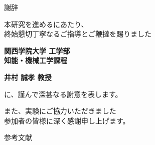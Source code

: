 \documentclass[aspectratio=169,10pt]{beamer}
\begin{document}
\begin{frame}{謝辞}
\begin{center}
\Large
本研究を進めるにあたり、\\
終始懇切丁寧なるご指導とご鞭撻を賜りました\\
\vspace{0.5cm}

\textbf{関西学院大学 工学部}\\
\textbf{知能・機械工学課程}\\
\vspace{0.3cm}

\textbf{井村 誠孝 教授}\\
\vspace{0.3cm}

に、謹んで深甚なる謝意を表します。\\
\vspace{0.5cm}

また、実験にご協力いただきました\\
参加者の皆様に深く感謝申し上げます。
\end{center}
\end{frame}

\begin{frame}[allowframebreaks]{参考文献}


\end{frame}
\end{document}
